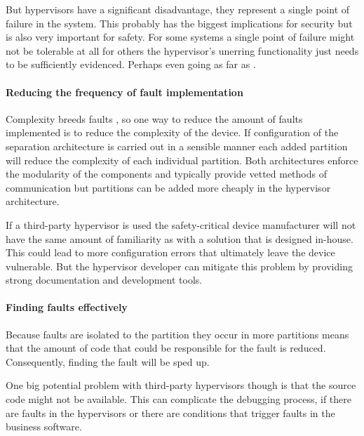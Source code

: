 But hypervisors have a significant disadvantage, they represent a single point of failure in the system. This probably has the biggest implications for security but is also very important for safety. For some systems a single point of failure might not be tolerable at all for others the hypervisor's unerring functionality just needs to be sufficiently evidenced. Perhaps even going as far as  \cite{fernandez2013camkes}\cite{klein2009sel4}.


\paragraph{Reducing the frequency of fault implementation}
Complexity breeds faults \cite{nguyen2017impact}, so one way to reduce the amount of faults implemented is to reduce the complexity of the device. If configuration of the separation architecture is carried out in a sensible manner each added partition will reduce the complexity of each individual partition. Both architectures enforce the modularity of the components and typically provide vetted methods of communication but partitions can be added more cheaply in the hypervisor architecture.

If a third-party hypervisor is used the safety-critical device manufacturer will not have the same amount of familiarity as with a solution that is designed in-house. This could lead to more configuration errors that ultimately leave the device vulnerable. But the hypervisor developer can mitigate this problem by providing strong documentation and development tools.

\paragraph{Finding  faults effectively}
Because faults are isolated to the partition they occur in more partitions means that the amount of code that could be responsible for the fault is reduced. Consequently, finding the fault will be sped up.

One big potential problem with third-party hypervisors though is that the source code might not be available. This can complicate the debugging process, if there are faults in the hypervisors or there are conditions that trigger faults in the business software. 

